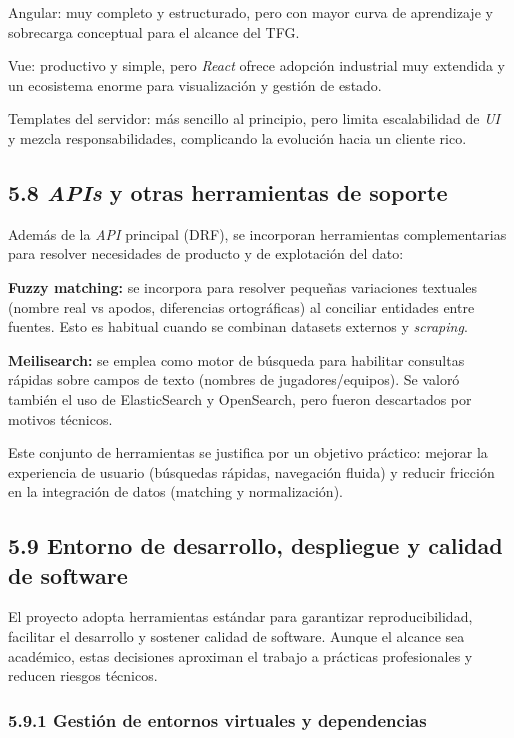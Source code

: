 Angular: muy completo y estructurado, pero con mayor curva de aprendizaje y sobrecarga conceptual 
para el alcance del TFG.

Vue: productivo y simple, pero \textit{React} ofrece adopción industrial muy extendida y un ecosistema enorme 
para visualización y gestión de estado.

Templates del servidor: más sencillo al principio, pero limita escalabilidad de \textit{UI} y mezcla 
responsabilidades, complicando la evolución hacia un cliente rico.

\subsection{5.8 \textit{APIs} y otras herramientas de soporte}

Además de la \textit{API} principal (DRF), se incorporan herramientas complementarias para resolver 
necesidades de producto y de explotación del dato:

\textbf{Fuzzy matching:} se incorpora para resolver pequeñas variaciones textuales (nombre real vs 
apodos, diferencias ortográficas) al conciliar entidades entre fuentes. Esto es habitual cuando se 
combinan datasets externos y \textit{scraping}.

\textbf{Meilisearch:} se emplea como motor de búsqueda para habilitar consultas rápidas sobre campos 
de texto (nombres de jugadores/equipos). Se valoró también el uso de ElasticSearch y OpenSearch, pero fueron descartados por motivos técnicos.

Este conjunto de herramientas se justifica por un objetivo práctico: mejorar la experiencia de usuario 
(búsquedas rápidas, navegación fluida) y reducir fricción en la integración de datos (matching y 
normalización).

\subsection{5.9 Entorno de desarrollo, despliegue y calidad de software}

El proyecto adopta herramientas estándar para garantizar reproducibilidad, facilitar el desarrollo 
y sostener calidad de software. Aunque el alcance sea académico, estas decisiones aproximan el 
trabajo a prácticas profesionales y reducen riesgos técnicos.

\subsubsection{5.9.1 Gestión de entornos virtuales y dependencias}

